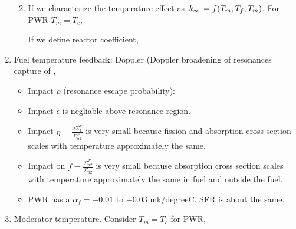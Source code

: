 \documentclass{school-22.211-notes}
\begin{document}
\begin{enumerate}
\begin{enumerate}

    \item If we characterize the temperature effect as $\left. k_{\infty} \right. = f(T_m,
      T_f, T_m)$. For PWR $T_m = T_c$,
 

      If we define reactor coefficient, 

  \end{enumerate}

\item Fuel temperature feedback: Doppler (Doppler broadening of
  resonances capture of ,

      \begin{itemize}
      \item Impact $\rho$ (resonance escape probability): 
    \item Impact $\epsilon$ is negliable above resonance region. 
    \item Impact $\eta = \frac{\nu \Sigma_f^F}{\Sigma_{a2}^F}$ is very
      small because fission and absorption cross section scales with
      temperature approximately the same.
    \item Impact on $f= \frac{\Sigma_{a2}^F}{\Sigma_{a2}}$ is very
      small because absorption cross section scales with temperature
      approximately the same in fuel and outside the fuel.
    \item PWR has a $\alpha_f = -0.01$ to $-0.03$ mk/degreeC. SFR is
      about the same.
      \end{itemize}
      
    \item Moderator temperature. Consider $T_m = T_c$ for PWR, 


\end{enumerate}
\end{document}
